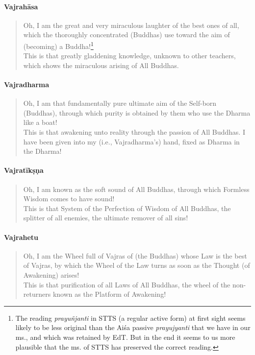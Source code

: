 \documentclass[11pt]{book}
\newcommand{\skt}[1]{\emph{#1}}
\begin{document}
\paragraph{Vajrahāsa}

\begin{verse}
Oh, I am the great and very miraculous laughter of the best ones of all, which the thoroughly concentrated (Buddhas) use toward the aim of (becoming) a Buddha!\footnote{The reading \skt{prayuñjanti} in STTS (a regular active form) at first sight seems likely to be less original than the Aiśa passive \skt{prayujyanti} that we have in our ms., and which was retained by EdT. But in the end it seems to us more plausible that the ms. of STTS has preserved the correct reading.}\\
This is that greatly gladdening knowledge, unknown to other teachers, which shows the miraculous arising of All Buddhas.
\end{verse}

\paragraph{Vajradharma}

\begin{verse}
Oh, I am that fundamentally pure ultimate aim of the Self-born (Buddhas), through which purity is obtained by them who use the Dharma like a boat!\\
This is that awakening unto reality through the passion of All Buddhas. I have been given into my (i.e., Vajradharma's) hand, fixed as Dharma in the Dharma! 
\end{verse}

\paragraph{Vajratīkṣṇa}

\begin{verse}
Oh, I am known as the soft sound of All Buddhas, through which Formless Wisdom comes to have sound!\\
This is that System of the Perfection of Wisdom of All Buddhas, the splitter of all enemies, the ultimate remover of all sins! 
\end{verse}

\paragraph{Vajrahetu}

\begin{verse}
Oh, I am the Wheel full of Vajras of (the Buddhas) whose Law is the best of Vajras, by which the Wheel of the Law turns as soon as the Thought (of Awakening) arises!\\
This is that purification of all Laws of All Buddhas, the wheel of the non-returners known as the Platform of Awakening!
\end{verse}
\end{document}
